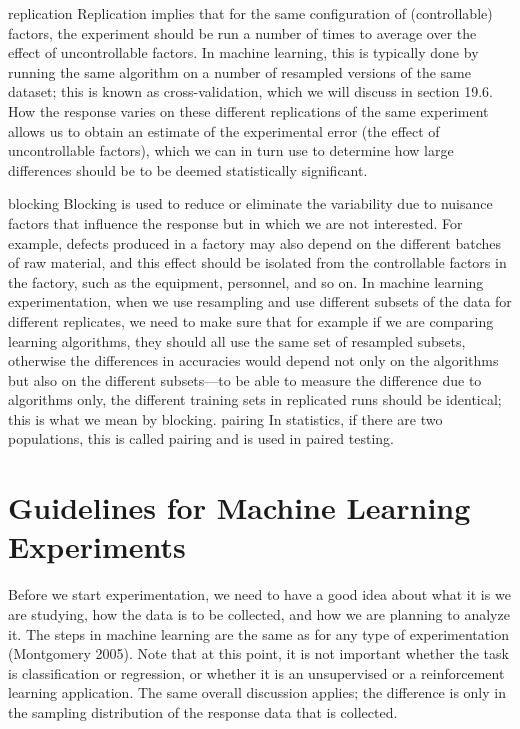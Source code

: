 replication Replication implies that for the same configuration of (controllable) factors, the experiment should be run a number of times to average over the effect of uncontrollable factors. In machine learning, this is typically done by running the same algorithm on a number of resampled versions of the same dataset; this is known as cross-validation, which we will discuss in section 19.6. How the response varies on these different replications of the same experiment allows us to obtain an estimate of the experimental error (the effect of uncontrollable factors), which we can in turn use to determine how large differences should be to be deemed statistically significant.

blocking Blocking is used to reduce or eliminate the variability due to nuisance factors that influence the response but in which we are not interested. For example, defects produced in a factory may also depend on the different batches of raw material, and this effect should be isolated from the controllable factors in the factory, such as the equipment, personnel, and so on. In machine learning experimentation, when we use resampling and use different subsets of the data for different replicates, we need to make sure that for example if we are comparing learning algorithms, they should all use the same set of resampled subsets, otherwise the differences in accuracies would depend not only on the algorithms but also on the different subsets---to be able to measure the difference due to algorithms only, the different training sets in replicated runs should be identical; this is what we mean by blocking. pairing In statistics, if there are two populations, this is called pairing and is used in paired testing.

\section{Guidelines for Machine Learning Experiments}

Before we start experimentation, we need to have a good idea about what it is we are studying, how the data is to be collected, and how we are planning to analyze it. The steps in machine learning are the same as for any type of experimentation (Montgomery 2005). Note that at this point, it is not important whether the task is classification or regression, or whether it is an unsupervised or a reinforcement learning application. The same overall discussion applies; the difference is only in the sampling distribution of the response data that is collected.

